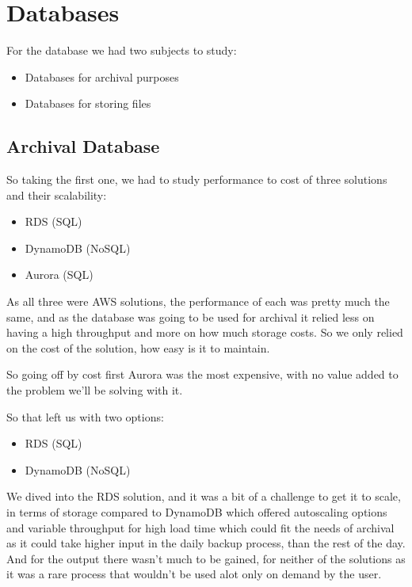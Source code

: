 \section {Databases}

For the database we had two subjects to study:
\begin{itemize}
        \item Databases for archival purposes
        \item Databases for storing files
    \end{itemize}

\subsection {Archival Database}

So taking the first one, we had to study performance to cost of three solutions and their scalability:

    \begin{itemize}
        \item RDS (SQL)
        \item DynamoDB (NoSQL)
        \item Aurora (SQL)
    \end{itemize}

As all three were AWS solutions, the performance of each was pretty much the same,
and as the database was going to be used for archival it relied less on having a
high throughput and more on how much storage costs.
So we only relied on the cost of the solution, how easy is it to maintain.

So going off by cost first Aurora was the most expensive, with no value added to the problem we'll be solving with it.

So that left us with two options:

    \begin{itemize}
        \item RDS (SQL)
        \item DynamoDB (NoSQL)
    \end{itemize}

We dived into the RDS solution, and it was a bit of a challenge to get it to scale,
in terms of storage compared to DynamoDB which offered autoscaling options and variable
throughput for high load time which could fit the needs of archival as it could take 
higher input in the daily backup process, than the rest of the day.
And for the output there wasn't much to be gained, for neither of the solutions as it was
a rare process that wouldn't be used alot only on demand by the user.

